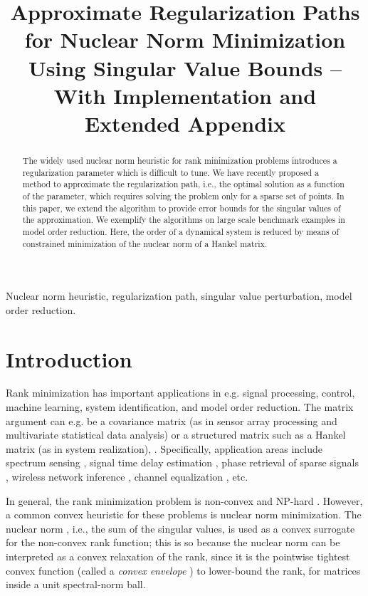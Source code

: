 \documentclass{article}
\title{Approximate Regularization Paths for Nuclear Norm Minimization Using Singular Value Bounds -- With Implementation and Extended Appendix}
\begin{document}
\maketitle
\begin{abstract}
The widely used nuclear norm heuristic for rank minimization problems introduces a regularization parameter which is difficult to tune. We have recently proposed a method to approximate the regularization path, i.e., the optimal solution as a function of the parameter, which requires solving the problem only for a sparse set of points. In this paper, we extend the algorithm to provide error bounds for the singular values of the approximation. We exemplify the algorithms on large scale benchmark examples in model order reduction. Here, the order of a dynamical system is reduced by means of constrained minimization of the nuclear norm of a Hankel matrix.\end{abstract}
\begin{keywords}
Nuclear norm heuristic, regularization path, singular value perturbation, model order reduction.
\end{keywords}


\section{Introduction}

Rank minimization has important applications in e.g. signal processing, control, machine learning, system identification, and model order reduction. The matrix argument can e.g. be a covariance matrix (as in sensor array processing and multivariate statistical data analysis) or a structured matrix such as a Hankel matrix (as in system realization), \cite{Fazel:2002}. Specifically, application areas include spectrum sensing \cite{Meng:2010}, signal time delay estimation \cite{Jiang:2013}, phase retrieval of sparse signals \cite{Jaganathan:2012}, wireless network inference \cite{Papailiopoulos:2012}, channel equalization \cite{Konishi:2011}, etc.

In general, the rank minimization problem is non-convex and NP-hard \cite{Vandenberghe:1996}. However, a common convex heuristic for these problems is nuclear norm minimization. The nuclear norm , i.e., the sum of the singular values, is used as a convex surrogate for the non-convex rank function; this is so because the nuclear norm can be interpreted as a convex relaxation of the rank, since it is the pointwise tightest convex function (called a \textit{convex envelope} \cite{Fazel-Hindi-Boyd-01}) to lower-bound the rank, for matrices inside a unit spectral-norm ball.
\end{document}
